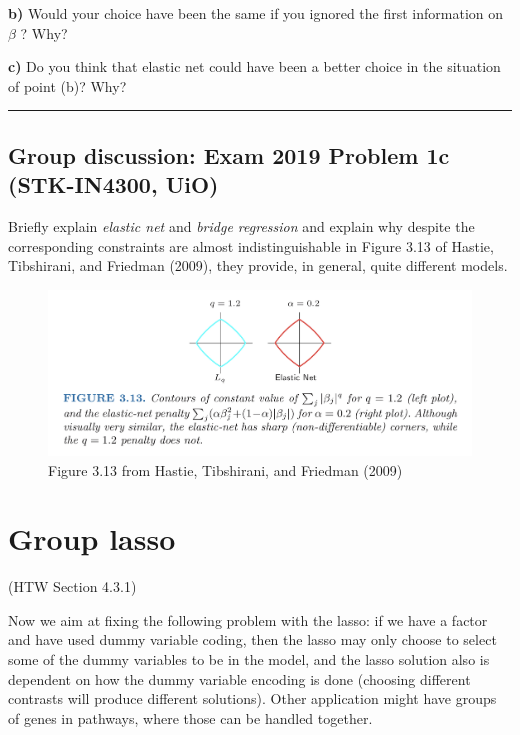 \documentclass[
  letterpaper,
  DIV=11,
  numbers=noendperiod]{scrartcl}
\begin{document}
\textbf{b)} Would your choice have been the same if you ignored the ﬁrst
information on \(\beta\) ? Why?

\textbf{c)} Do you think that elastic net could have been a better
choice in the situation of point (b)? Why?

\begin{center}\rule{0.5\linewidth}{0.5pt}\end{center}

\hypertarget{group-discussion-exam-2019-problem-1c-stk-in4300-uio}{%
\subsection{Group discussion: Exam 2019 Problem 1c (STK-IN4300,
UiO)}\label{group-discussion-exam-2019-problem-1c-stk-in4300-uio}}

Briefly explain \emph{elastic net} and \emph{bridge regression} and
explain why despite the corresponding constraints are almost
indistinguishable in Figure 3.13 of Hastie, Tibshirani, and Friedman
(2009), they provide, in general, quite different models.

\begin{figure}

{\centering \includegraphics[width=1\textwidth,height=\textheight]{./ESLFig313.jpg}

}

\caption{Figure 3.13 from Hastie, Tibshirani, and Friedman (2009)}

\end{figure}

\hypertarget{group-lasso}{%
\section{Group lasso}\label{group-lasso}}

(HTW Section 4.3.1)

Now we aim at fixing the following problem with the lasso: if we have a
factor and have used dummy variable coding, then the lasso may only
choose to select some of the dummy variables to be in the model, and the
lasso solution also is dependent on how the dummy variable encoding is
done (choosing different contrasts will produce different solutions).
Other application might have groups of genes in pathways, where those
can be handled together.
\end{document}
